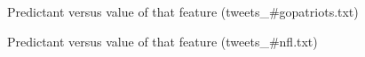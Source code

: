 \documentclass{article}
\begin{document}
\begin{figure}
\centering
{}
\caption{Predictant versus value of that feature (tweets\_\#gopatriots.txt)} \label{Q5_2}
\end{figure}

\begin{figure}
\centering
{}
\caption{Predictant versus value of that feature (tweets\_\#nfl.txt)} \label{Q5_3}
\end{figure}
\end{document}
